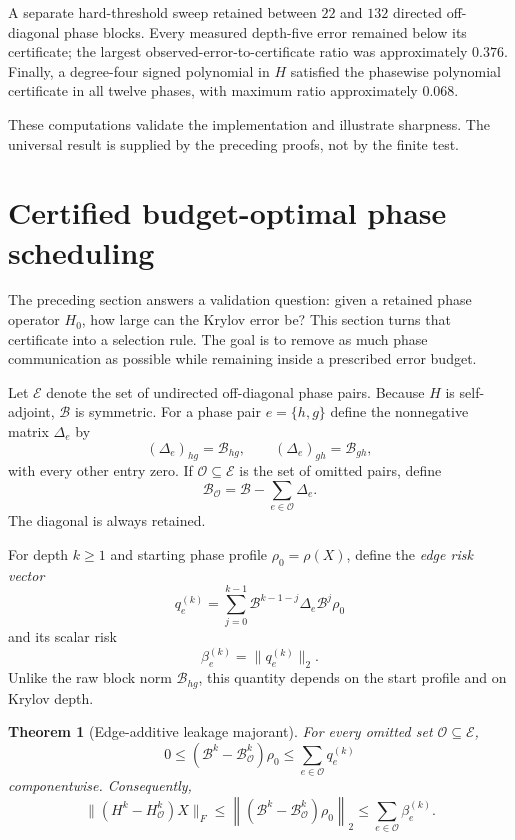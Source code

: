 \documentclass[11pt]{article}
\newtheorem{theorem}{Theorem}[section]
\theoremstyle{definition}
\theoremstyle{remark}
\begin{document}
A separate hard-threshold sweep retained between $22$ and $132$ directed
off-diagonal phase blocks.  Every measured depth-five error remained below its
certificate; the largest observed-error-to-certificate ratio was approximately
$0.376$.  Finally, a degree-four signed polynomial in $H$ satisfied the
phasewise polynomial certificate in all twelve phases, with maximum ratio
approximately $0.068$.

These computations validate the implementation and illustrate sharpness.  The
universal result is supplied by the preceding proofs, not by the finite test.


\section{Certified budget-optimal phase scheduling}
\label{sec:budget-scheduler}

The preceding section answers a validation question: given a retained phase
operator $H_0$, how large can the Krylov error be?  This section turns that
certificate into a selection rule.  The goal is to remove as much phase
communication as possible while remaining inside a prescribed error budget.

Let $\mathcal E$ denote the set of undirected off-diagonal phase pairs.  Because
$H$ is self-adjoint, $\mathcal B$ is symmetric.  For a phase pair
$e=\{h,g\}$ define the nonnegative matrix $\Delta_e$ by
\[
(\Delta_e)_{hg}=\mathcal B_{hg},\qquad
(\Delta_e)_{gh}=\mathcal B_{gh},
\]
with every other entry zero.  If $\mathcal O\subseteq\mathcal E$ is the set
of omitted pairs, define
\[
\mathcal B_{\mathcal O}
=\mathcal B-\sum_{e\in\mathcal O}\Delta_e.
\]
The diagonal is always retained.

For depth $k\ge1$ and starting phase profile $\rho_0=\rho(X)$, define the
\emph{edge risk vector}
\[
\boxed{
q_e^{(k)}
=
\sum_{j=0}^{k-1}
\mathcal B^{k-1-j}\Delta_e\mathcal B^j\rho_0
}
\]
and its scalar risk
\[
\boxed{
\beta_e^{(k)}=\lVert q_e^{(k)}\rVert_2.
}
\]
Unlike the raw block norm $\mathcal B_{hg}$, this quantity depends on the
start profile and on Krylov depth.

\begin{theorem}[Edge-additive leakage majorant]
\label{thm:edge-additive-majorant}
For every omitted set $\mathcal O\subseteq\mathcal E$,
\[
\boxed{
0\le
(\mathcal B^k-\mathcal B_{\mathcal O}^k)\rho_0
\le
\sum_{e\in\mathcal O}q_e^{(k)}
}
\]
componentwise.  Consequently,
\[
\boxed{
\lVert(H^k-H_{\mathcal O}^k)X\rVert_F
\le
\left\lVert
(\mathcal B^k-\mathcal B_{\mathcal O}^k)\rho_0
\right\rVert_2
\le
\sum_{e\in\mathcal O}\beta_e^{(k)}.
}
\]
\end{theorem}
\end{document}
